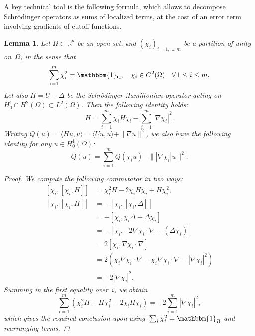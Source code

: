 \documentclass[10pt]{article}
\newcommand{\R}{\mathbb{R}}
\newcommand{\1}{\mathbbm 1}
\newtheorem{lemma}{Lemma}
\begin{document}
    A key technical tool is the following formula, which allows to decompose Schr\"odinger operators as sums of localized terms, at the cost of an error term involving gradients of cutoff functions.
    \begin{lemma}\label{lemma:ims_formula}
        Let $\Omega \subset \R^d$ be an open set, and $(\chi_i)_{i=1,\dots,m}$ be a partition of unity on~$\Omega$, in the sense that
        \[\sum_{i=1}^m \chi_i^2 = \mathbbm{1}_{\Omega},\quad \chi_i\in C^2(\Omega)\quad\forall\,1\leq i\leq m.\]
        Let also $H = U-\Delta$ be the Schr\"odinger Hamiltonian operator acting on $H_0^1\cap H^2(\Omega) \subset L^2(\Omega)$.
        Then the following identity holds:
        \begin{equation}
            \label{eq:ims_formula}
            H = \sum_{i=1}^m \chi_i H \chi_i - \sum_{i=1}^m |\nabla \chi_i|^2.
        \end{equation}
        Writing $Q(u) = \langle Hu,u\rangle = \langle U u,u\rangle + \|\nabla u\|^2$, we also have the following identity for any $u\in H_0^1(\Omega)$:
        \begin{equation}
            \label{eq:ims_formula_quad}
            Q(u) = \sum_{i=1}^m Q(\chi_i u) - \| |\nabla \chi_i| u\|^2.
        \end{equation}
        
        \begin{proof}
            We compute the following commutator in two ways:
            \[ \begin{aligned}
                \left[ \chi_i, [\chi_i,H]\right] &= \chi_i^2 H - 2\chi_i H \chi_i + H \chi_i^2,\\
                \left[ \chi_i, [\chi_i,H]\right]&= -\left[\chi_i , [\chi_i,\Delta]\right]\\
                &= -\left[\chi_i,\chi_i\Delta-\Delta \chi_i\right]\\
                &= -\left[\chi_i,-2\nabla\chi_i\cdot\nabla - (\Delta \chi_i)\right]\\
                &= 2\left[\chi_i,\nabla\chi_i\cdot\nabla\right]\\
                &= 2\left(\chi_i\nabla\chi_i\cdot \nabla -\chi_i\nabla\chi_i\cdot \nabla - |\nabla\chi_i|^2\right)\\
                &=-2|\nabla \chi_i|^2.
            \end{aligned} \]
            Summing in the first equality over~$i$, we obtain
            \[\sum_{i=1}^m \left(\chi_i^2 H + H\chi_i^2 -2 \chi_i H \chi_i\right) = -2 \sum_{i=1}^m |\nabla \chi_i|^2,\]
            which gives the required conclusion upon using~$\sum_i \chi_i^2 = \mathbbm{1}_\Omega$ and rearranging terms.


\end{proof}
\end{lemma}
\end{document}

